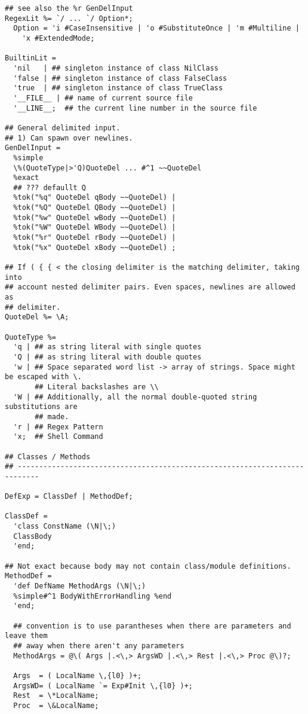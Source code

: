 \documentclass{article}
\begin{document}
\begin{verbatim}
## see also the %r GenDelInput
RegexLit %= `/ ... `/ Option*;   
  Option = 'i #CaseInsensitive | 'o #SubstituteOnce | 'm #Multiline |
    'x #ExtendedMode;
  
BuiltinLit =                       
  'nil   | ## singleton instance of class NilClass
  'false | ## singleton instance of class FalseClass
  'true  | ## singleton instance of class TrueClass
  '__FILE__ | ## name of current source file
  '__LINE__;  ## the current line number in the source file
  
## General delimited input.
## 1) Can spawn over newlines.
GenDelInput =
  %simple
  \%(QuoteType|>'Q)QuoteDel ... #^1 ~~QuoteDel 
  %exact              
  ## ??? defaullt Q
  %tok("%q" QuoteDel qBody ~~QuoteDel) |
  %tok("%Q" QuoteDel QBody ~~QuoteDel) |
  %tok("%w" QuoteDel wBody ~~QuoteDel) |
  %tok("%W" QuoteDel WBody ~~QuoteDel) |
  %tok("%r" QuoteDel rBody ~~QuoteDel) |
  %tok("%x" QuoteDel xBody ~~QuoteDel) ;
              
## If ( { { < the closing delimiter is the matching delimiter, taking into
## account nested delimiter pairs. Even spaces, newlines are allowed as
## delimiter.
QuoteDel %= \A;
              
QuoteType %=
  'q | ## as string literal with single quotes
  'Q | ## as string literal with double quotes
  'w | ## Space separated word list -> array of strings. Space might be escaped with \.
       ## Literal backslashes are \\
  'W | ## Additionally, all the normal double-quoted string substitutions are
       ## made.
  'r | ## Regex Pattern
  'x;  ## Shell Command 

## Classes / Methods
## ---------------------------------------------------------------------------

DefExp = ClassDef | MethodDef;   
   
ClassDef =
  'class ConstName (\N|\;)
  ClassBody
  'end;   
   
## Not exact because body may not contain class/module definitions. 
MethodDef =
  'def DefName MethodArgs (\N|\;)
  %simple#^1 BodyWithErrorHandling %end
  'end;
          
  ## convention is to use parantheses when there are parameters and leave them
  ## away when there aren't any parameters 
  MethodArgs = @\( Args |.<\,> ArgsWD |.<\,> Rest |.<\,> Proc @\)?;
             
  Args  = ( LocalName \,{l0} )+;
  ArgsWD= ( LocalName `= Exp#Init \,{l0} )+;
  Rest  = \*LocalName;
  Proc  = \&LocalName;
  

\end{verbatim}
\end{document}
